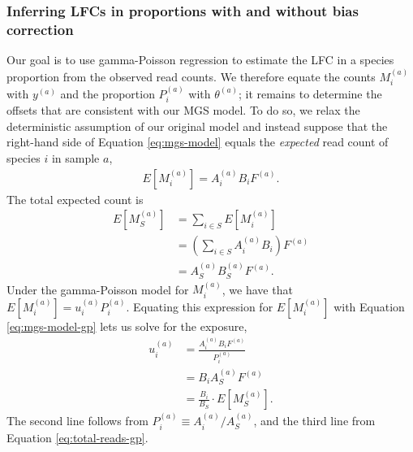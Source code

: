 \documentclass[
]{article}
\begin{document}
\hypertarget{inferring-lfcs-in-proportions-with-and-without-bias-correction}{%
\subsubsection{Inferring LFCs in proportions with and without bias correction}\label{inferring-lfcs-in-proportions-with-and-without-bias-correction}}

Our goal is to use gamma-Poisson regression to estimate the LFC in a species proportion from the observed read counts.
We therefore equate the counts \(M_i^{(a)}\) with \(y^{(a)}\) and the proportion \(P_{i}^{(a)}\) with \(\theta^{(a)}\); it remains to determine the offsets that are consistent with our MGS model.
To do so, we relax the deterministic assumption of our original model and instead suppose that the right-hand side of Equation \eqref{eq:mgs-model} equals the \emph{expected} read count of species \(i\) in sample \(a\),
\begin{align}
  \label{eq:mgs-model-gp}
  E[M_i^{(a)}] = A_i^{(a)} B_i F^{(a)}.
\end{align}
The total expected count is
\begin{align}
  \label{eq:total-reads-gp}
  E[M_S^{(a)}] &= \sum_{i \in S} E[M_i^{(a)}]
  \\&= \left( \sum_{i \in S} A_i^{(a)} B_i \right) F^{(a)} 
  \\&= A_S^{(a)} B_S^{(a)} F^{(a)}.
\end{align}
Under the gamma-Poisson model for \(M_i^{(a)}\), we have that \(E[M_i^{(a)}] = u_i^{(a)} P_i^{(a)}\).
Equating this expression for \(E[M_i^{(a)}]\) with Equation \eqref{eq:mgs-model-gp} lets us solve for the exposure,
\begin{align}
  \label{eq:exposure}
  u_i^{(a)} 
    &= \frac{A_i^{(a)} B_i F^{(a)}}{P_i^{(a)}} 
  \\&= B_i A_S^{(a)} F^{(a)}
  \\&= \frac{B_i}{B_S} \cdot E[M_S^{(a)}].
\end{align}
The second line follows from \(P_i^{(a)} \equiv A_i^{(a)}/ A_S^{(a)}\), and the third line from Equation \eqref{eq:total-reads-gp}.
\end{document}
